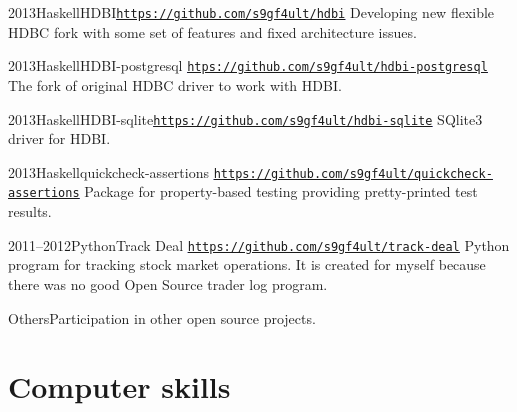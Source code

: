 \documentclass[11pt,a4paper,sans]{moderncv}        %
\newcommand*{\hlink}[1]{\textcolor{blue}{\texttt{\underline{\href{#1}{#1}}}}}
\begin{document}
\cventry
    {2013}{Haskell}{HDBI}{\hlink{https://github.com/s9gf4ult/hdbi}}{}
    {Developing new flexible HDBC fork with some set of features and fixed
      architecture issues.}

\cventry
    {2013}{Haskell}{HDBI-postgresql}%
    {\hlink{htps://github.com/s9gf4ult/hdbi-postgresql}}{}
    {The fork of original HDBC driver to work with HDBI.}

\cventry
    {2013}{Haskell}{HDBI-sqlite}{\hlink{https://github.com/s9gf4ult/hdbi-sqlite}}{}
    {SQlite3 driver for HDBI.}

\cventry
    {2013}{Haskell}{quickcheck-assertions}%
    {\hlink{https://github.com/s9gf4ult/quickcheck-assertions}}{}{%
      Package for property-based testing providing pretty-printed test results.}

\cventry
    {2011--2012}{Python}{Track Deal}%
    {\hlink{https://github.com/s9gf4ult/track-deal}}{}
    {Python program for tracking stock market operations. It is created for
      myself because there was no good Open Source trader log program.}

\cvitem
    {Others}{Participation in other open source projects.}


\section{Computer skills}

\end{document}
